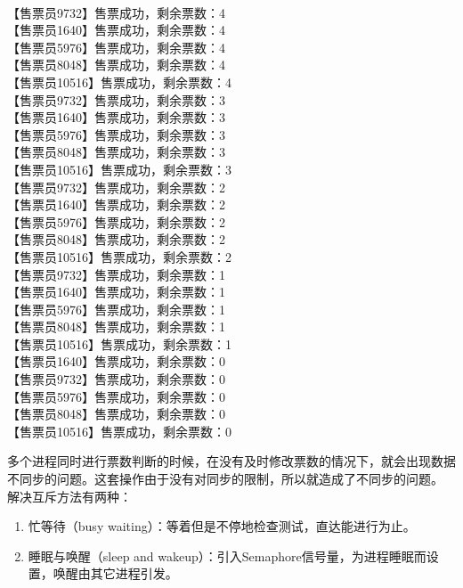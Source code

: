 \begin{tcolorbox}
	 \\
	【售票员9732】售票成功，剩余票数：4 \\
	【售票员1640】售票成功，剩余票数：4 \\
	【售票员5976】售票成功，剩余票数：4 \\
	【售票员8048】售票成功，剩余票数：4 \\
	【售票员10516】售票成功，剩余票数：4 \\
	【售票员9732】售票成功，剩余票数：3 \\
	【售票员1640】售票成功，剩余票数：3 \\
	【售票员5976】售票成功，剩余票数：3 \\
	【售票员8048】售票成功，剩余票数：3 \\
	【售票员10516】售票成功，剩余票数：3 \\
	【售票员9732】售票成功，剩余票数：2  \\
	【售票员1640】售票成功，剩余票数：2  \\
	【售票员5976】售票成功，剩余票数：2  \\
	【售票员8048】售票成功，剩余票数：2  \\
	【售票员10516】售票成功，剩余票数：2 \\
	【售票员9732】售票成功，剩余票数：1 \\
	【售票员1640】售票成功，剩余票数：1 \\
	【售票员5976】售票成功，剩余票数：1 \\
	【售票员8048】售票成功，剩余票数：1 \\
	【售票员10516】售票成功，剩余票数：1 \\
	【售票员1640】售票成功，剩余票数：0 \\
	【售票员9732】售票成功，剩余票数：0 \\
	【售票员5976】售票成功，剩余票数：0 \\
	【售票员8048】售票成功，剩余票数：0 \\
	【售票员10516】售票成功，剩余票数：0
\end{tcolorbox}

多个进程同时进行票数判断的时候，在没有及时修改票数的情况下，就会出现数据不同步的问题。这套操作由于没有对同步的限制，所以就造成了不同步的问题。 \\

解决互斥方法有两种：

\begin{enumerate}
	\item 忙等待（busy waiting）：等着但是不停地检查测试，直达能进行为止。

	\item 睡眠与唤醒（sleep and wakeup）：引入Semaphore信号量，为进程睡眠而设置，唤醒由其它进程引发。
\end{enumerate}

